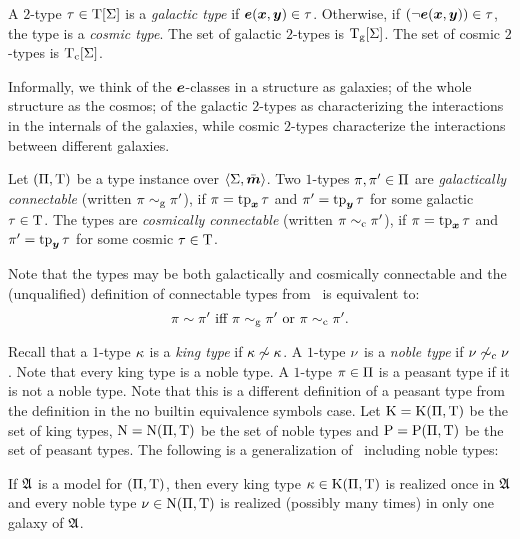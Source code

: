 \begin{definition}
A $2$-type $\tau \in \mathrm{T}[\mathrm{\Sigma}]$ is a \emph{galactic type} if $\bm{e}(\bm{x},\bm{y}) \in
\tau$.
Otherwise, if $(\lnot\bm{e}(\bm{x},\bm{y})) \in \tau$, the type is a \emph{cosmic type}.
The set of galactic $2$-types is $\mathrm{T}_{\mathrm{g}}[\mathrm{\Sigma}]$.
The set of cosmic $2$-types is $\mathrm{T}_{\mathrm{c}}[\mathrm{\Sigma}]$.
\end{definition}
Informally, we think of the $\bm{e}$-classes in a structure as galaxies; of the
whole structure as the cosmos; of the galactic $2$-types as characterizing the
interactions in the internals of the galaxies, while cosmic $2$-types
characterize the interactions between different galaxies.

\begin{definition}
Let $(\Pi,\mathrm{T})$ be a type instance over $\left\langle \mathrm{\Sigma},\bar{\bm{m}} \right\rangle$.
Two $1$-types $\pi, {\pi'} \in \Pi$ are \emph{galactically connectable}
(written $\pi \sim_{\mathrm{g}} {\pi'}$), if $\pi = \operatorname{tp}_{\bm{x}}\tau$ and ${\pi'} = \operatorname{tp}_{\bm{y}}\tau$
for some galactic $\tau \in \mathrm{T}$.
The types are \emph{cosmically connectable} (written $\pi \sim_{\mathrm{c}} {\pi'}$), if
$\pi = \operatorname{tp}_{\bm{x}}\tau$ and ${\pi'} = \operatorname{tp}_{\bm{y}}\tau$ for some cosmic $\tau \in \mathrm{T}$.
\end{definition}

Note that the types may be both galactically and cosmically connectable and the
(unqualified) definition of connectable types from~ is
equivalent to:
\[\pi \sim {\pi'} \text{ iff } \pi \sim_{\mathrm{g}} {\pi'} \text{ or } \pi \sim_{\mathrm{c}}
{\pi'}.\]

Recall that a $1$-type $\kappa$ is a \emph{king type} if $\kappa \not\sim \kappa$.
A $1$-type $\nu$ is a \emph{noble type} if $\nu \not\sim_{\mathrm{c}} \nu$. Note that
every king type is a noble type. A $1$-type $\pi \in \Pi$ is a peasant type
if it is not a noble type.
Note that this is a different definition of a peasant type from the definition in the
no builtin equivalence symbols case.
Let $\mathrm{K} = \mathrm{K}(\Pi,\mathrm{T})$ be the set of king types, $\mathrm{\mathrm{N}} = \mathrm{\mathrm{N}}(\Pi,\mathrm{T})$
be the set of noble types and $\mathrm{P} = \mathrm{P}(\Pi,\mathrm{T})$ be the set of peasant
types. The following is a generalization of~
including noble types:
\begin{remark}\label{rem:twovar-noble-once}
If $\mathfrak{A}$ is a model for $(\Pi,\mathrm{T})$, then every king type
$\kappa \in \mathrm{K}(\Pi,\mathrm{T})$ is realized once in $\mathfrak{A}$ and every noble type
$\nu \in \mathrm{\mathrm{N}}(\Pi,\mathrm{T})$ is realized (possibly many times) in only one galaxy
of $\mathfrak{A}$.
\end{remark}

